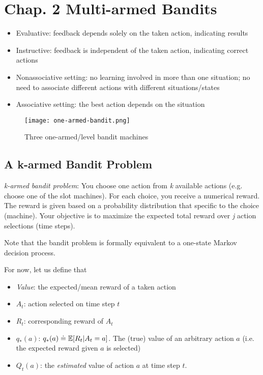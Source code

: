 \documentclass[sutton_barto_notes.tex]{subfiles}
\begin{document}
\newpage
\section{Chap. 2 Multi-armed Bandits}
\begin{itemize}
\item Evaluative: feedback depends solely on the taken action, indicating results
\item Instructive: feedback is independent of the taken action, indicating correct actions
\item Nonassociative setting: no learning involved in more than one situation; no need to associate different actions with different situations/states
\item Associative setting: the best action depends on the situation
\end{itemize}

\begin{figure}[!h]
  \texttt{[image: one-armed-bandit.png]}
  \caption{Three one-armed/level bandit machines}
  \label{fig:bandit-machine}
\end{figure}

\subsection{A k-armed Bandit Problem}

\textit{k-armed bandit problem}:
You choose one action from \textit{k} available actions (e.g. choose one of the slot machines). For each choice, you receive a numerical reward. The reward is given based on a probability distribution that specific to the choice (machine). Your objective is to maximize the expected total reward over \textit{j} action selections (time steps).

Note that the bandit problem is formally equivalent to a one-state Markov decision process. 

For now, let us define that
\begin{itemize}
\item \textit{Value}: the expected/mean reward of a taken action
\item $A_t$: action selected on time step $t$
\item $R_t$: corresponding reward of $A_t$
\item $q_{*}(a)$:  $q_{*}(a) \doteq \operatorname*{\mathbb{E}}[R_t|A_t=a]$. The (true) value of an arbitrary action $a$ (i.e. the expected reward given $a$ is selected)
\item $Q_t(a)$: the \textit{estimated} value of action $a$ at time step $t$.
\end{itemize}
\end{document}
